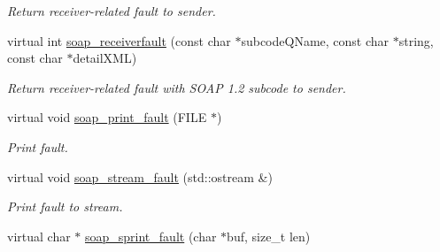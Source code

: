 \begin{DoxyCompactItemize}
\begin{DoxyCompactList}\small\item\em Return receiver-\/related fault to sender. \item\end{DoxyCompactList}\item 
\hypertarget{classPASSSubscriberPortBindingService_abb694c2ad4043906a4180516686a1d53}{
virtual int \hyperlink{classPASSSubscriberPortBindingService_abb694c2ad4043906a4180516686a1d53}{soap\_\-receiverfault} (const char $\ast$subcodeQName, const char $\ast$string, const char $\ast$detailXML)}
\label{classPASSSubscriberPortBindingService_abb694c2ad4043906a4180516686a1d53}

\begin{DoxyCompactList}\small\item\em Return receiver-\/related fault with SOAP 1.2 subcode to sender. \item\end{DoxyCompactList}\item 
\hypertarget{classPASSSubscriberPortBindingService_ada2a92b7f498b50ab2e94fc0dcc4d918}{
virtual void \hyperlink{classPASSSubscriberPortBindingService_ada2a92b7f498b50ab2e94fc0dcc4d918}{soap\_\-print\_\-fault} (FILE $\ast$)}
\label{classPASSSubscriberPortBindingService_ada2a92b7f498b50ab2e94fc0dcc4d918}

\begin{DoxyCompactList}\small\item\em Print fault. \item\end{DoxyCompactList}\item 
\hypertarget{classPASSSubscriberPortBindingService_a5fb140de581859f2b5d7706b17c04e70}{
virtual void \hyperlink{classPASSSubscriberPortBindingService_a5fb140de581859f2b5d7706b17c04e70}{soap\_\-stream\_\-fault} (std::ostream \&)}
\label{classPASSSubscriberPortBindingService_a5fb140de581859f2b5d7706b17c04e70}

\begin{DoxyCompactList}\small\item\em Print fault to stream. \item\end{DoxyCompactList}\item 
\hypertarget{classPASSSubscriberPortBindingService_a0885b0cc45c5fc0a5eae7872039a701c}{
virtual char $\ast$ \hyperlink{classPASSSubscriberPortBindingService_a0885b0cc45c5fc0a5eae7872039a701c}{soap\_\-sprint\_\-fault} (char $\ast$buf, size\_\-t len)}
\label{classPASSSubscriberPortBindingService_a0885b0cc45c5fc0a5eae7872039a701c}


\end{DoxyCompactItemize}
